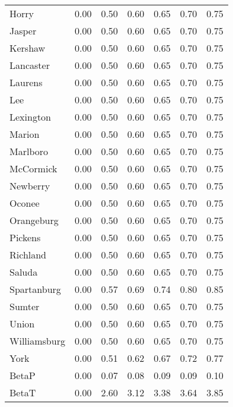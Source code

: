 \begin{tabular}{lrrrrrr}
       Horry & 0.00 & 0.50 & 0.60 &  0.65 & 0.70 &  0.75 \\
      Jasper & 0.00 & 0.50 & 0.60 &  0.65 & 0.70 &  0.75 \\
     Kershaw & 0.00 & 0.50 & 0.60 &  0.65 & 0.70 &  0.75 \\
   Lancaster & 0.00 & 0.50 & 0.60 &  0.65 & 0.70 &  0.75 \\
     Laurens & 0.00 & 0.50 & 0.60 &  0.65 & 0.70 &  0.75 \\
         Lee & 0.00 & 0.50 & 0.60 &  0.65 & 0.70 &  0.75 \\
   Lexington & 0.00 & 0.50 & 0.60 &  0.65 & 0.70 &  0.75 \\
      Marion & 0.00 & 0.50 & 0.60 &  0.65 & 0.70 &  0.75 \\
    Marlboro & 0.00 & 0.50 & 0.60 &  0.65 & 0.70 &  0.75 \\
   McCormick & 0.00 & 0.50 & 0.60 &  0.65 & 0.70 &  0.75 \\
    Newberry & 0.00 & 0.50 & 0.60 &  0.65 & 0.70 &  0.75 \\
      Oconee & 0.00 & 0.50 & 0.60 &  0.65 & 0.70 &  0.75 \\
  Orangeburg & 0.00 & 0.50 & 0.60 &  0.65 & 0.70 &  0.75 \\
     Pickens & 0.00 & 0.50 & 0.60 &  0.65 & 0.70 &  0.75 \\
    Richland & 0.00 & 0.50 & 0.60 &  0.65 & 0.70 &  0.75 \\
      Saluda & 0.00 & 0.50 & 0.60 &  0.65 & 0.70 &  0.75 \\
 Spartanburg & 0.00 & 0.57 & 0.69 &  0.74 & 0.80 &  0.85 \\
      Sumter & 0.00 & 0.50 & 0.60 &  0.65 & 0.70 &  0.75 \\
       Union & 0.00 & 0.50 & 0.60 &  0.65 & 0.70 &  0.75 \\
Williamsburg & 0.00 & 0.50 & 0.60 &  0.65 & 0.70 &  0.75 \\
        York & 0.00 & 0.51 & 0.62 &  0.67 & 0.72 &  0.77 \\
       BetaP & 0.00 & 0.07 & 0.08 &  0.09 & 0.09 &  0.10 \\
       BetaT & 0.00 & 2.60 & 3.12 &  3.38 & 3.64 &  3.85 \\
\bottomrule
\end{tabular}
